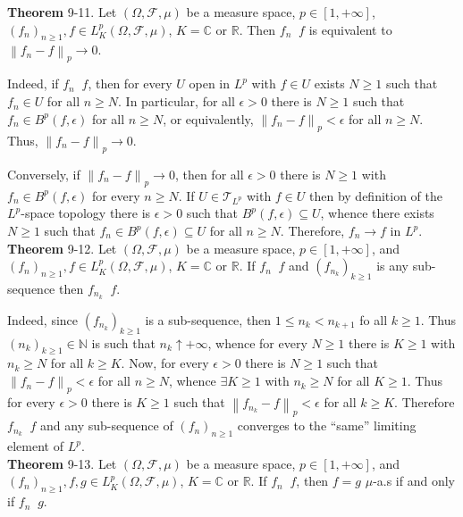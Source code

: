 \documentclass[a4paper]{article}
\newcommand{\clo}[1]{\left [ #1 \right ]}
\newcommand{\brac}[1]{\left ( #1 \right )}
\newcommand{\nrm}[1]{\left\| #1 \right \|}
\newcommand{\Real}{\mathbb{R}}
\newcommand{\Cplx}{\mathbb{C}}
\newcommand{\Tcal}{\mathcal{T}}
\newcommand{\Fcal}{\mathcal{F}}
\newcommand{\lpto}{\mathop{\overset{L^p}{\to}}\nolimits}
\begin{document}
\label{thm:lpto_nrm_infinitesimal} \noindent \textbf{Theorem} 9-11.
Let $\brac{\Omega, \Fcal, \mu}$ be a measure space, $p\in \clo{1,+\infty}$, $\brac{f_n}_{n\geq 1}, f\in L^p_K\brac{\Omega, \Fcal, \mu}$, $K=\Cplx$ or $\Real$. Then $f_n\lpto f$ is equivalent to $\nrm{f_n-f}_p \to 0$.

Indeed, if $f_n\lpto f$, then for every $U$ open in $L^p$ with $f\in U$ exists $N\geq 1$ such that $f_n\in U$ for all $n\geq N$. In particular, for all $\epsilon>0$ there is $N\geq 1$ such that $f_n\in B^p\brac{f, \epsilon}$ for all $n\geq N$, or equivalently, $\nrm{f_n-f}_p< \epsilon$ for all $n\geq N$. Thus, $\nrm{f_n-f}_p\to 0$.

Conversely, if $\nrm{f_n-f}_p\to 0$, then for all $\epsilon>0$ there is $N\geq 1$ with $f_n\in B^p\brac{f,\epsilon}$ for every $n\geq N$. If $U\in \Tcal_{L^p}$ with $f\in U$ then by definition of the $L^p$-space topology there is $\epsilon>0$ such that $B^p\brac{f,\epsilon}\subseteq U$, whence there exists $N\geq 1$ such that $f_n\in B^p\brac{f,\epsilon}\subseteq U$ for all $n\geq N$. Therefore, $f_n\to f$ in $L^p$.\\

\label{thm:seq_subseq_conv} \noindent \textbf{Theorem} 9-12.
Let $\brac{\Omega, \Fcal, \mu}$ be a measure space, $p\in \clo{1,+\infty}$, and $\brac{f_n}_{n\geq 1}, f\in L^p_K\brac{\Omega, \Fcal, \mu}$, $K=\Cplx$ or $\Real$. If $f_n\lpto f$ and $\brac{f_{n_k}}_{k\geq 1}$ is any sub-sequence then $f_{n_k}\lpto f$.

Indeed, since $\brac{f_{n_k}}_{k\geq 1}$ is a sub-sequence, then $1\leq n_k<n_{k+1}$ fo all $k\geq 1$. Thus $\brac{n_k}_{k\geq 1}\in \mathbb{N}$ is such that $n_k\uparrow +\infty$, whence for every $N\geq 1$ there is $K\geq 1$ with $n_k\geq N$ for all $k\geq K$. Now, for every $\epsilon>0$ there is $N\geq 1$ such that $\nrm{f_n-f}_p<\epsilon$ for all $n\geq N$, whence $\exists K\geq 1$ with $n_k\geq N$ for all $K\geq 1$. Thus for every $\epsilon>0$ there is $K\geq 1$ such that $\nrm{f_{n_k}-f}_p<\epsilon$ for all $k\geq K$. Therefore $f_{n_k}\lpto f$ and any sub-sequence of $\brac{f_n}_{n\geq 1}$ converges to the ``same'' limiting element of $L^p$.\\

\label{thm:lpto_limit_muas} \noindent \textbf{Theorem} 9-13.
Let $\brac{\Omega, \Fcal, \mu}$ be a measure space, $p\in \clo{1,+\infty}$, and $\brac{f_n}_{n\geq 1},f, g\in L^p_K\brac{\Omega, \Fcal, \mu}$, $K=\Cplx$ or $\Real$. If $f_n\lpto f$, then $f=g$ $\mu$-a.s if and only if $f_n\lpto g$. 
\end{document}
